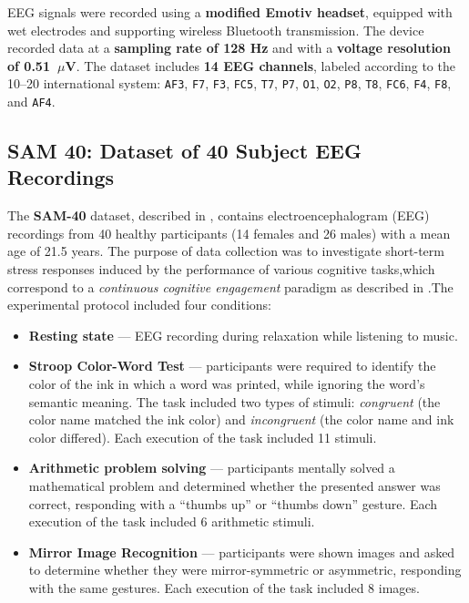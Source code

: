 \documentclass[utf8]{FrontiersinHarvard} %
\begin{document}
EEG signals were recorded using a \textbf{modified Emotiv headset}, equipped with wet electrodes and supporting wireless Bluetooth transmission. The device recorded data at a \textbf{sampling rate of 128 Hz} and with a \textbf{voltage resolution of 0.51~$\mu$V}. The dataset includes \textbf{14 EEG channels}, labeled according to the 10--20 international system: \texttt{AF3}, \texttt{F7}, \texttt{F3}, \texttt{FC5}, \texttt{T7}, \texttt{P7}, \texttt{O1}, \texttt{O2}, \texttt{P8}, \texttt{T8}, \texttt{FC6}, \texttt{F4}, \texttt{F8}, and \texttt{AF4}.

\subsection{SAM 40: Dataset of 40 Subject EEG Recordings}
The \textbf{SAM-40} dataset, described in \cite{ghosh2022sam40}, contains electroencephalogram (EEG) recordings from 40 healthy participants (14 females and 26 males) with a mean age of 21.5 years. The purpose of data collection was to investigate short-term stress responses induced by the performance of various cognitive tasks,which correspond to a \textit{continuous cognitive engagement} paradigm as described in \cite{chen2025hybrid}.The experimental protocol included four conditions:
\begin{itemize}
    \item \textbf{Resting state} — EEG recording during relaxation while listening to music.
    \item \textbf{Stroop Color-Word Test} — participants were required to identify the color of the ink in which a word was printed, while ignoring the word’s semantic meaning. The task included two types of stimuli: \textit{congruent} (the color name matched the ink color) and \textit{incongruent} (the color name and ink color differed). Each execution of the task included 11 stimuli.
    \item \textbf{Arithmetic problem solving} — participants mentally solved a mathematical problem and determined whether the presented answer was correct, responding with a ``thumbs up'' or ``thumbs down'' gesture. Each execution of the task included 6 arithmetic stimuli.
    \item \textbf{Mirror Image Recognition} — participants were shown images and asked to determine whether they were mirror-symmetric or asymmetric, responding with the same gestures. Each execution of the task included 8 images.
\end{itemize}
\end{document}
